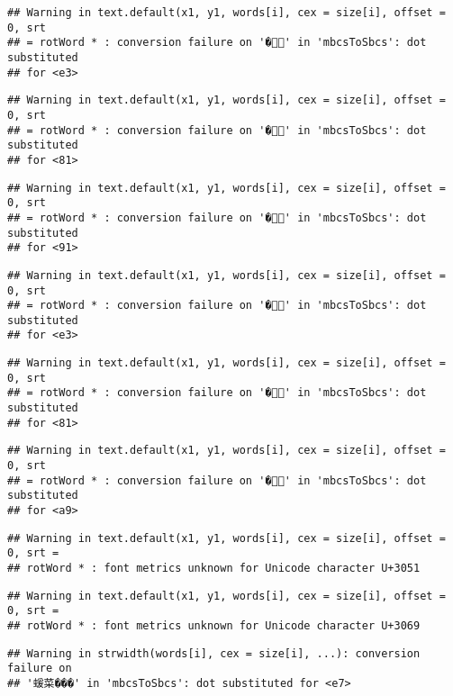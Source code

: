 \documentclass[]{article}
\begin{document}
\begin{verbatim}
## Warning in text.default(x1, y1, words[i], cex = size[i], offset = 0, srt
## = rotWord * : conversion failure on '�' in 'mbcsToSbcs': dot substituted
## for <e3>
\end{verbatim}

\begin{verbatim}
## Warning in text.default(x1, y1, words[i], cex = size[i], offset = 0, srt
## = rotWord * : conversion failure on '�' in 'mbcsToSbcs': dot substituted
## for <81>
\end{verbatim}

\begin{verbatim}
## Warning in text.default(x1, y1, words[i], cex = size[i], offset = 0, srt
## = rotWord * : conversion failure on '�' in 'mbcsToSbcs': dot substituted
## for <91>
\end{verbatim}

\begin{verbatim}
## Warning in text.default(x1, y1, words[i], cex = size[i], offset = 0, srt
## = rotWord * : conversion failure on '�' in 'mbcsToSbcs': dot substituted
## for <e3>
\end{verbatim}

\begin{verbatim}
## Warning in text.default(x1, y1, words[i], cex = size[i], offset = 0, srt
## = rotWord * : conversion failure on '�' in 'mbcsToSbcs': dot substituted
## for <81>
\end{verbatim}

\begin{verbatim}
## Warning in text.default(x1, y1, words[i], cex = size[i], offset = 0, srt
## = rotWord * : conversion failure on '�' in 'mbcsToSbcs': dot substituted
## for <a9>
\end{verbatim}

\begin{verbatim}
## Warning in text.default(x1, y1, words[i], cex = size[i], offset = 0, srt =
## rotWord * : font metrics unknown for Unicode character U+3051
\end{verbatim}

\begin{verbatim}
## Warning in text.default(x1, y1, words[i], cex = size[i], offset = 0, srt =
## rotWord * : font metrics unknown for Unicode character U+3069
\end{verbatim}

\begin{verbatim}
## Warning in strwidth(words[i], cex = size[i], ...): conversion failure on
## '蝯菜���' in 'mbcsToSbcs': dot substituted for <e7>
\end{verbatim}
\end{document}
